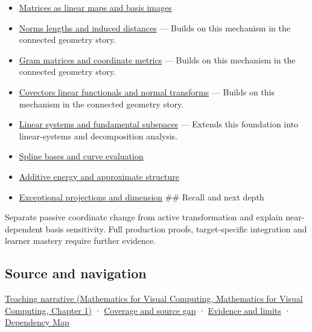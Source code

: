 \begin{itemize}
\item
  \hyperref[appendix-bd39c3bf5d64]{Matrices as linear maps and basis images}
\item
  \hyperref[appendix-49933872bb51]{Norms lengths and induced distances} --- Builds on this mechanism in the connected geometry story.
\item
  \hyperref[appendix-3b863809f82a]{Gram matrices and coordinate metrics} --- Builds on this mechanism in the connected geometry story.
\item
  \hyperref[appendix-46da295c6787]{Covectors linear functionals and normal transforms} --- Builds on this mechanism in the connected geometry story.
\item
  \hyperref[appendix-8572a4a060c1]{Linear systems and fundamental subspaces} --- Extends this foundation into linear-systems and decomposition analysis.
\item
  \hyperref[appendix-f28eeec97a3d]{Spline bases and curve evaluation}
\item
  \hyperref[appendix-b0732b22e7d6]{Additive energy and approximate structure}
\item
  \hyperref[appendix-3c73f7862157]{Exceptional projections and dimension} \#\# Recall and next depth
\end{itemize}

Separate passive coordinate change from active transformation and explain near-dependent basis sensitivity. Full production proofs, target-specific integration and learner mastery require further evidence.

\subsection{Source and navigation}\label{appendix-ce0341f7ea0d-source-and-navigation}

\href{../02-Mathematics-for-Visual-Computing/main.pdf\#nameddest=01-foundations-i-ch017-a-basis-is-a-measuring-arrangement-not-the-vector-itself}{Teaching narrative (Mathematics for Visual Computing, Mathematics for Visual Computing, Chapter 1)} · \hyperref[appendix-fd090d982a15-phase-6---parts-501-600]{Coverage and source gap} · \hyperref[appendix-a103e7846d21-phase-6---source-analysis-and-verification]{Evidence and limits} · \hyperref[appendix-4ad47bdd269a]{Dependency Map}
